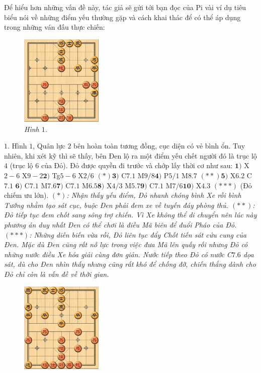 \begin{multicols}{2}
	Để hiểu hơn những vấn đề này, tác giả sẽ gửi tới bạn đọc của Pi vài ví dụ tiêu biểu nói về những điểm yếu thường gặp và cách khai thác để có thể áp dụng trong những ván đấu thực chiến:
	\begin{figure}[H]
		\vspace*{-5pt}
		\centering
		\captionsetup{labelformat= empty, justification=centering}
		\includegraphics[width= 0.35\textwidth]{1}
		\caption{\small\textit{\color{gocco}Hình $1$.}}
		\vspace*{-10pt}
	\end{figure}
	$1.$ Hình $1$, Quân lực $2$ bên hoàn toàn tương đồng, cục diện có vẻ bình ổn. Tuy nhiên, khi xét kỹ thì sẽ thấy, bên Đen lộ ra một điểm yếu chết người đó là trục lộ $4$ (trục lộ $6$ của Đỏ). Đỏ được quyền đi trước và chớp lấy thời cơ như sau:
	\vskip 0.1cm
	$\pmb{1)}$	X$2-6$ X$9-2$\quad  $\pmb{2)}$ Tg$5-6$ X$2/6$ $(*)$\quad $\pmb{3)}$ C$7.1$ M$9/8$\quad $\pmb{4)}$ P$5/1$ M$8.7$ $(**)$\quad $\pmb{5)}$ X$6.2$ C$7.1$ \quad $\pmb{6)}$ C$7.1$ M$7.6$\quad $\pmb{7)}$ C$7.1$ M$6.5$\quad $\pmb{8)}$ X$4/3$ M$5.7$\quad $\pmb{9)}$ C$7.1$ M$7/6$\quad $\pmb{10)}$ X$4.3$ $(***)$ (Đỏ chiếm ưu lớn).
	\vskip 0.1cm
	\textit{$(*)$: Nhận thấy yếu điểm, Đỏ nhanh chóng bình Xe rồi bình Tướng nhằm tạo sát cục, buộc Đen phải đem xe về tuyến đáy phòng thủ.
	\vskip 0.1cm
	$(**)$: Đỏ tiếp tục đem chốt sang sông trợ chiến. Vì Xe không thể di chuyển nên lúc này phương án duy nhất Đen có thể chơi là điều Mã biên để đuổi Pháo của Đỏ.
	\vskip 0.1cm
	$(***)$: Những diễn biến vừa rồi, Đỏ liên tục đẩy Chốt tiến sát cửu cung của Đen. Mặc dù Đen cũng rất nỗ lực trong việc đưa Mã lên quấy rối nhưng Đỏ có những nước điều Xe hóa giải cùng đơn giản. Nước tiếp theo Đỏ có nước C$7.6$ dọa sát, dù cho Đen nhìn thấy nhưng cũng rất khó để chống đỡ, chiến thắng dành cho Đỏ chỉ còn là vấn đề về thời gian.}
	\begin{figure}[H]
		\vspace*{-5pt}
		\centering
		\captionsetup{labelformat= empty, justification=centering}
		\includegraphics[width= 0.35\textwidth]{2}

\end{figure}
\end{multicols}
